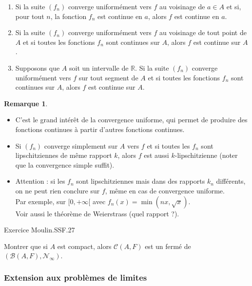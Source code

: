 \documentclass[french]{article}
\newcommand{\R}{\mathbb{R}}
\theoremstyle{plain}
\theoremstyle{definition}
\newtheorem*{rmq}{Remarque}
\theoremstyle{remark}
\begin{document}
\begin{cor}%
	\begin{enumerate}
		\item Si la suite $(f_n)$ converge uniformément vers $f$ au voisinage de $a\in A$ et si, pour tout $n$, la fonction $f_n$ est continue en $a$, alors $f$ est continue en $a$.
		\item Si la suite $(f_n)$ converge uniformément vers $f$ au voisinage de tout point de $A$ et si toutes les fonctions $f_n$ sont continues sur $A$, alors $f$ est continue sur $A$.
		\item Supposons que $A$ soit un intervalle de $\R$. Si la suite $(f_n)$ converge uniformément vers $f$ sur tout segment de $A$ et si toutes les fonctions $f_n$ sont continues sur $A$, alors $f$ est continue sur $A$.
	\end{enumerate}
\end{cor}

\begin{rmq}
	\begin{itemize}
		\item C'est le grand intérêt de la convergence uniforme, qui permet de produire des fonctions continues à partir d'autres fonctions continues.
		\item Si $(f_n)$ converge simplement sur $A$ vers $f$ et si toutes les $f_n$ sont lipschitziennes de même rapport $k$, alors $f$ est aussi $k$-lipschitzienne (noter que la convergence simple suffit).
		\item Attention : si les $f_n$ sont lipschitziennes mais dans des rapports $k_n$ différents, on ne peut rien conclure sur $f$, même en cas de convergence uniforme. \\
		Par exemple, sur $[0,+\infty[$ avec $f_n(x)=\min (nx,\sqrt{x})$.\\
		Voir aussi le théorème de Weierstrass (quel rapport ?).
	\end{itemize}
\end{rmq}

Exercice Moulin.SSF.27

\begin{exo}
	Montrer que si $A$ est compact, alors $\mathcal{C}(A,F)$ est un fermé de $(\mathcal{B}(A,F),\mathcal{N}_\infty)$.
\end{exo}

\subsubsection*{Extension aux problèmes de limites}
\end{document}
